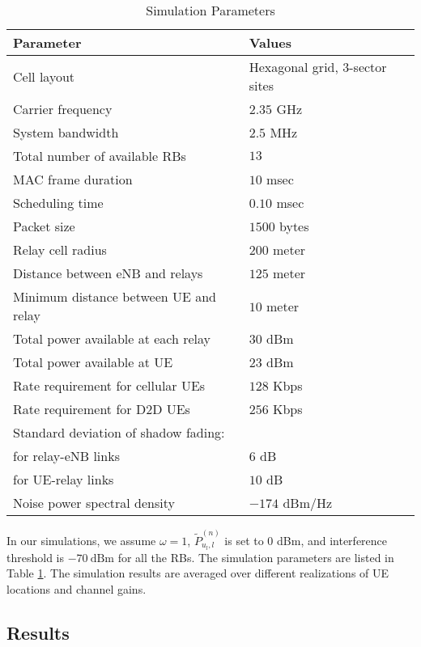 \documentclass[twocolumn,10pt]{IEEEtran}
\begin{document}
\begin{table}[!t]
\renewcommand{\arraystretch}{1.3}
\caption{Simulation Parameters}
\label{tab:sim_param}
\centering
\begin{tabular}{l|l}
\hline
\bfseries Parameter & \bfseries Values\\
\hline\hline
Cell layout & Hexagonal grid, $3$-sector sites \\
Carrier frequency & $2.35$ GHz \\
System bandwidth & $2.5$ MHz \\
Total number of available RBs & $13$ \\
MAC frame duration & $10$ msec \\
Scheduling time & $0.10$ msec \\
Packet size & $1500$ bytes \\
Relay cell radius & $200$ meter\\
Distance between eNB and relays & $125$ meter\\
Minimum distance between UE and relay & $10$ meter\\
Total power available at each relay & $30$ dBm \\
Total power available at UE & $23$ dBm \\
Rate requirement for cellular UEs & $128$ Kbps \\
Rate requirement for D2D UEs & $256$ Kbps \\
Standard deviation of shadow fading: \\
 \hspace{5em} for relay-eNB links & $6$ dB \\
 \hspace{5em} for UE-relay links & $10$ dB \\
Noise power spectral density & $-174$ dBm/Hz \\
\hline
\end{tabular}
\end{table}

In our simulations, we assume $\omega = 1$, $\tilde{P}_{u_l,l}^{(n)}$ is set to $0$ dBm, and interference threshold is $-70~ \text{dBm}$ for all the RBs. The simulation parameters  are listed in Table \ref{tab:sim_param}. The simulation results are averaged over different realizations of  UE locations and channel gains.

\subsection{Results} \label{sec:numerical_results}
\end{document}
